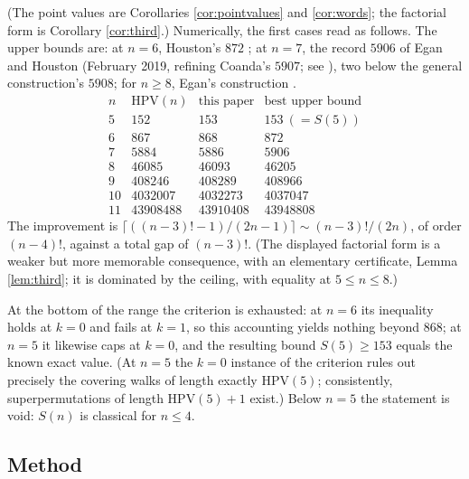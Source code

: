 \documentclass[11pt]{article}
\newcommand{\HPV}{\mathrm{HPV}}
\begin{document}
\noindent
(The point values are Corollaries \ref{cor:pointvalues} and \ref{cor:words}; the
factorial form is Corollary \ref{cor:third}.)
Numerically, the first cases read as follows.  The upper bounds are: at \(n=6\), Houston's
\(872\) \cite{Houston}; at \(n=7\), the record \(5906\) of Egan and Houston (February 2019,
refining Coanda's \(5907\); see \cite{Egan,EV}), two below the general construction's \(5908\);
for \(n\ge 8\), Egan's construction \cite{Egan}.
\[
\begin{array}{c|c|c|c}
n & \HPV(n) & \text{this paper} & \text{best upper bound}\\ \hline
5 & 152 & 153 & 153\ (=S(5))\\
6 & 867 & 868 & 872\\
7 & 5884 & 5886 & 5906\\
8 & 46085 & 46093 & 46205\\
9 & 408246 & 408289 & 408966\\
10 & 4032007 & 4032273 & 4037047\\
11 & 43908488 & 43910408 & 43948808
\end{array}
\]
The improvement is \(\lceil((n-3)!-1)/(2n-1)\rceil\sim(n-3)!/(2n)\), of order \((n-4)!\),
against a total gap of \((n-3)!\).  (The displayed factorial form is a weaker but more memorable consequence, with an
elementary certificate, Lemma \ref{lem:third}; it is dominated by the ceiling, with
equality at \(5\le n\le 8\).)

At the bottom of the range the criterion is exhausted: at \(n=6\) its inequality holds at
\(k=0\) and fails at \(k=1\), so this accounting yields nothing beyond \(868\); at \(n=5\)
it likewise caps at \(k=0\), and the resulting bound \(S(5)\ge 153\) equals the known exact
value.  (At \(n=5\) the \(k=0\) instance of the criterion rules out precisely the covering walks of
length exactly \(\HPV(5)\); consistently, superpermutations of length \(\HPV(5)+1\)
exist.)  Below
\(n=5\) the statement is void: \(S(n)\) is classical for \(n\le 4\).

\subsection*{Method}
\end{document}
